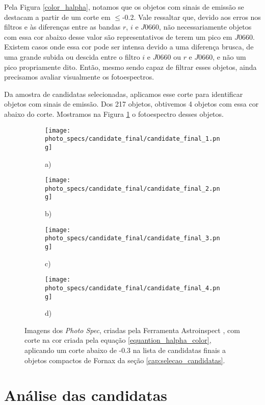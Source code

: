 Pela Figura \ref{color_halpha}, notamos que os objetos com sinais de emissão se destacam a partir de um corte em $\leq$-0.2. Vale ressaltar que, devido aos erros nos filtros e às diferenças entre as bandas $r$, $i$ e $J0660$, não necessariamente objetos com essa cor abaixo desse valor são representativos de terem um pico em $J0660$. Existem casos onde essa cor pode ser intensa devido a uma diferença brusca, de uma grande subida ou descida entre o filtro $i$ e $J0660$ ou $r$ e $J0660$, e não um pico propriamente dito. Então, mesmo sendo capaz de filtrar esses objetos, ainda precisamos avaliar visualmente os fotoespectros.

Da amostra de candidatas selecionadas, aplicamos esse corte para identificar objetos com sinais de emissão. Dos 217 objetos, obtivemos 4 objetos com essa cor abaixo do corte. Mostramos na Figura \ref{halpha_candidatas_final} o fotoespectro desses objetos.

\begin{figure}[!ht]
    \centering
    \captionsetup{justification=centering}
    \begin{subfigure}[b]{0.45\textwidth}
        \texttt{[image: photo\_specs/candidate\_final/candidate\_final\_1.png]}
        \caption{a)}
    \end{subfigure}
    \begin{subfigure}[b]{0.45\textwidth}
        \texttt{[image: photo\_specs/candidate\_final/candidate\_final\_2.png]}
        \caption{b)}
    \end{subfigure}
    \begin{subfigure}[b]{0.45\textwidth}
        \texttt{[image: photo\_specs/candidate\_final/candidate\_final\_3.png]}
        \caption{c)}
    \end{subfigure}
    \begin{subfigure}[b]{0.45\textwidth}
        \texttt{[image: photo\_specs/candidate\_final/candidate\_final\_4.png]}
        \caption{d)}
    \end{subfigure}
    \caption{Imagens dos \textit{Photo Spec}, criadas pela Ferramenta Astroinspect \cite{astroinspect}, com corte na cor criada pela equação \ref{equantion_halpha_color}, aplicando um corte abaixo de -0.3 na lista de candidatas finais a objetos compactos de Fornax da seção \ref{cap:selecao_candidatas}.}
    \label{halpha_candidatas_final}
\end{figure}

\section{Análise das candidatas}\label{sec:analise_candidatas}

